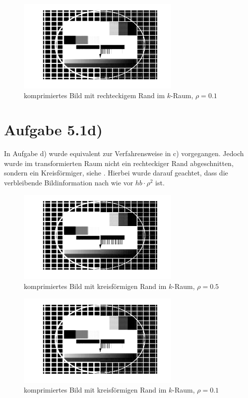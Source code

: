 \begin{figure}[htb]
\centering
  \includegraphics[width=0.7\textwidth,keepaspectratio]{../tmp/eins_c_0_1}
  \caption{komprimiertes Bild mit rechteckigem Rand im $k$-Raum, $ρ=0.1$}
  \label{fig:1c1}
\end{figure}

\section*{Aufgabe 5.1d)}

In Aufgabe d) wurde equivalent zur Verfahrensweise in c) vorgegangen.
Jedoch wurde im transformierten Raum nicht ein rechteckiger Rand abgeschnitten,
sondern ein Kreisförmiger, siehe . Hierbei wurde darauf geachtet, dass die verbleibende
Bildinformation nach wie vor $hb\cdot ρ^2$ ist.



\begin{figure}[htb]
\centering
  \includegraphics[width=0.7\textwidth,keepaspectratio]{../tmp/eins_c_0_5}
  \caption{komprimiertes Bild mit kreisförmigen Rand im $k$-Raum, $ρ=0.5$}
  \label{fig:1d5}
\end{figure}

\begin{figure}[htb]
\centering
  \includegraphics[width=0.7\textwidth,keepaspectratio]{../tmp/eins_c_0_1}
  \caption{komprimiertes Bild mit kreisförmigen Rand im $k$-Raum, $ρ=0.1$}
  \label{fig:1d1}
\end{figure}

